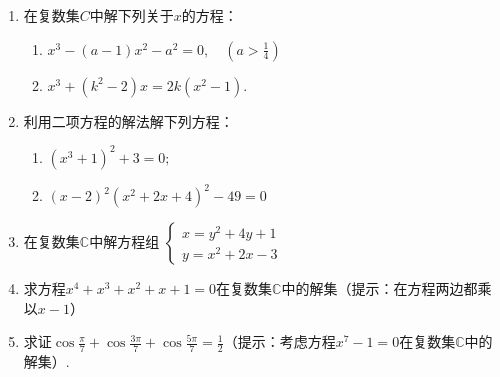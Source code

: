 \begin{enumerate}
\item 在复数集$C$中解下列关于$x$的方程：
\begin{enumerate}[(1)]
    \item $x^{3}- ( a- 1) x^{2}- a^{2}= 0,\quad \left ( a> \frac 14\right )$
    \item $x^{3}+(k^{2}-2)x=2k(x^{2}-1).$
\end{enumerate}

\item 利用二项方程的解法解下列方程：
\begin{enumerate}[(1)]
  \item $(x^{3}+1)^{2}+3=0;$
\item $( x- 2) ^{2}( x^{2}+ 2x+ 4) ^{2}- 49= 0$
\end{enumerate}
\item 在复数集$\mathbb{C}$中解方程组
$\begin{cases}x=y^{2}+4y+1\\y=x^{2}+2x-3\end{cases}$
\item 求方程$x^4+x^3+x^2+x+1=0$在复数集$\mathbb{C}$中的解集（提示：在方程两边都乘以$x-1$）
\item 求证$\cos\frac{\pi}{7}+\cos\frac{3\pi}{7}+\cos\frac{5\pi}{7}=\frac{1}{2}$（提示：考虑方程$x^7-1=0$在复数集$\mathbb{C}$中的解集）.

\end{enumerate}
